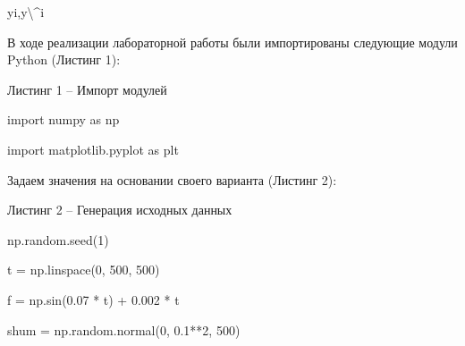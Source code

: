 \documentclass{article}%
\begin{document}
\begin{enumerate}
yi,y\textbackslash{}^{}i%
%
\begin{flushleft}%
В ходе реализации лабораторной работы были импортированы следующие модули Python (Листинг 1):%
%
\end{flushleft}%
\begin{flushleft}%
Листинг 1 – Импорт модулей%
%
\end{flushleft}%
\begin{flushleft}%
import numpy as np%
%
\end{flushleft}%
\begin{flushleft}%
import matplotlib.pyplot as plt%
%
\end{flushleft}%
\begin{flushleft}%
Задаем значения на основании своего варианта (Листинг 2):%
%
\end{flushleft}%
\begin{flushleft}%
Листинг 2 – Генерация исходных данных%
%
\end{flushleft}%
\begin{flushleft}%
np.random.seed(1)%
%
\end{flushleft}%
\begin{flushleft}%
t = np.linspace(0, 500, 500)%
%
\end{flushleft}%
\begin{flushleft}%
f = np.sin(0.07 * t) + 0.002 * t%
%
\end{flushleft}%
\begin{flushleft}%
shum = np.random.normal(0, 0.1**2, 500)%
%
\end{flushleft}%
\begin{flushleft}%

\end{flushleft}
\end{enumerate}
\end{document}

